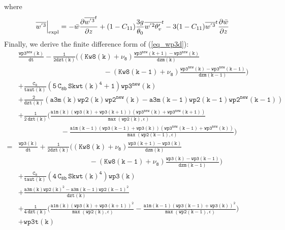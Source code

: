 \documentclass[11pt,fleqn]{article}
\newcommand{\ptlder}[2]{\frac{\partial #1}{\partial #2}}
\begin{document}
%
where
%
\begin{equation}
\label{eq_wp3t}
\left. \overline{w^{'3}} \right|_{\rm expl}
= 
  - \bar{w}\ptlder{\overline{w^{'3}}^{t}}{z}	 
  + (1 - C_{11}) \frac{3g}{\theta_0} \overline{w^{'2}\theta'_v}^t
  - 3 ( 1 - C_{11} ) \overline{w^{'3}}^t\ptlder{\bar{w}}{z}
\end{equation}
%
Finally, we derive the finite difference form of (\ref{eq_wp3d}):
%
\begin{equation}
\label{eq_wp3e}
\begin{split}
& \mathtt{
  \frac{wp3^{new}(k)}{dt}
  - \frac{1}{2dzt(k)} 
    \bigg( 
            \left(Kw8(k)+\nu_8\right)
            \frac{wp3^{new}(k+1)-wp3^{new}(k)}{dzm(k)} }  \\
& \mathtt{ \qquad \qquad \qquad \qquad \qquad \qquad
          - \left(Kw8(k-1)+\nu_8\right)
            \frac{wp3^{new}(k)-wp3^{new}(k-1)}{dzm(k-1)}
    \bigg)
  } \\
& \mathtt{
+ \frac{C_8}{taut(k)}
   \left(  5 \, C_{8b} \, {Skwt(k)}^4 + 1 \right) wp3^{new}(k)
  } \\
& \mathtt{
  + \frac{2}{dzt(k)} 
    \left(a3m(k) wp2(k) wp2^{new}(k) - a3m(k-1) wp2(k-1) wp2^{new}(k-1) \right)
  } \\
& \mathtt{
  + \frac{1}{2 \, dzt(k)}
    \bigg(
      \frac{ a1m(k)
             \left(wp3(k)+wp3(k+1)\right)
             \left(wp3^{new}(k)+wp3^{new}(k+1)\right) }
           { \max\left( wp2(k), \epsilon \right) }
  } \\
& \mathtt{ \quad \quad \quad \quad \quad \quad
     -\frac{ a1m(k-1) 
             \left(wp3(k-1)+wp3(k)\right)
             \left(wp3^{new}(k-1)+wp3^{new}(k)\right) }
           { \max\left( wp2(k-1), \epsilon \right) }
    \bigg)
  } \\
=& \mathtt{
  \frac{wp3(k)}{dt} 
  + \frac{1}{2dzt(k)} 
    \bigg( 
            \left(Kw8(k)+\nu_8\right)
            \frac{wp3(k+1)-wp3(k)}{dzm(k)} }  \\
& \mathtt{ \qquad \qquad \qquad \qquad \qquad
          - \left(Kw8(k-1)+\nu_8\right)
            \frac{wp3(k)-wp3(k-1)}{dzm(k-1)}
    \bigg)
  } \\
& \mathtt{
+ \frac{C_8}{taut(k)}
   \left( 4 \, C_{8b} \, {Skwt(k)}^4 \right) wp3(k)
  } \\
& \mathtt{
  + \frac{a3m(k) wp2(k)^2 - a3m(k-1) wp2(k-1)^2 }
         {dzt(k)}
  } \\
& \mathtt{
  + \frac{1}{4 \, dzt(k)}
    \bigg(
      \frac{ a1m(k) 
             \left(wp3(k)+wp3(k+1)\right)^2 }
           { \max\left( wp2(k), \epsilon \right) }
     -\frac{ a1m(k-1)
             \left(wp3(k-1)+wp3(k)\right)^2 }
           { \max\left( wp2(k-1), \epsilon \right) }
    \bigg)
  } \\
& \mathtt{
+ wp3t(k)
  }
\end{split}
\end{equation}
\end{document}
